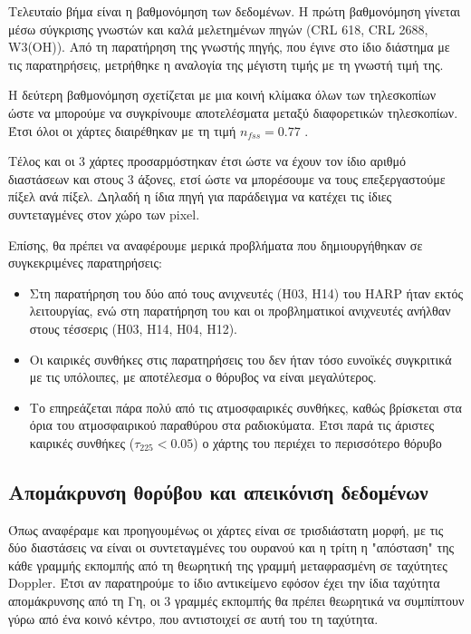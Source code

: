 \documentclass[a4paper,12pt]{memoir}
\begin{document}
Τελευταίο βήμα είναι η βαθμονόμηση των δεδομένων. Η πρώτη βαθμονόμηση γίνεται μέσω σύγκρισης γνωστών και καλά μελετημένων πηγών (CRL 618, CRL 2688, W3(OH)). Από τη παρατήρηση της γνωστής πηγής, που έγινε στο ίδιο διάστημα με τις παρατηρήσεις, μετρήθηκε η αναλογία της μέγιστη τιμής με τη γνωστή τιμή της. 

Η δεύτερη βαθμονόμηση σχετίζεται με μια κοινή κλίμακα όλων των τηλεσκοπίων ώστε να μπορούμε να συγκρίνουμε αποτελέσματα μεταξύ διαφορετικών τηλεσκοπίων. Έτσι όλοι οι χάρτες διαιρέθηκαν με τη τιμή $n_{fss}=0.77$ \cite{buckle_:_2009}. 

Τέλος και οι 3 χάρτες προσαρμόστηκαν έτσι ώστε να έχουν τον ίδιο αριθμό διαστάσεων και στους 3 άξονες, ετσί ώστε να μπορέσουμε να τους επεξεργαστούμε πίξελ ανά πίξελ. Δηλαδή η ίδια πηγή για παράδειγμα να κατέχει τις ίδιες συντεταγμένες στον χώρο των pixel.

Επίσης, θα πρέπει να αναφέρουμε μερικά προβλήματα που δημιουργήθηκαν σε συγκεκριμένες παρατηρήσεις:
\begin{itemize}
\item Στη παρατήρηση του  δύο από τους ανιχνευτές (H03, H14) του HARP ήταν εκτός λειτουργίας, ενώ στη παρατήρηση του  και  οι προβληματικοί ανιχνευτές ανήλθαν στους τέσσερις (H03, H14, H04, H12). 
\item Οι καιρικές συνθήκες στις παρατηρήσεις του  δεν ήταν τόσο ευνοϊκές συγκριτικά με τις υπόλοιπες, με αποτέλεσμα ο θόρυβος να είναι μεγαλύτερος.
\item Το  επηρεάζεται πάρα πολύ από τις ατμοσφαιρικές συνθήκες, καθώς βρίσκεται στα όρια του ατμοσφαιρικού παραθύρου στα ραδιοκύματα. Έτσι παρά τις άριστες καιρικές συνθήκες ($\tau _{225} <0.05$) ο χάρτης του  περιέχει το περισσότερο θόρυβο
\end{itemize}

\subsection{Απομάκρυνση θορύβου και απεικόνιση δεδομένων}
Όπως αναφέραμε και προηγουμένως οι χάρτες είναι σε τρισδιάστατη μορφή, με τις δύο διαστάσεις να είναι οι συντεταγμένες του ουρανού και η τρίτη η "απόσταση" της κάθε γραμμής εκπομπής από τη θεωρητική της γραμμή μεταφρασμένη σε ταχύτητες Doppler. Έτσι αν παρατηρούμε το ίδιο αντικείμενο εφόσον έχει την ίδια ταχύτητα απομάκρυνσης από τη Γη, οι 3 γραμμές εκπομπής θα πρέπει θεωρητικά να συμπίπτουν γύρω από ένα κοινό κέντρο, που αντιστοιχεί σε αυτή του τη ταχύτητα.
\end{document}
